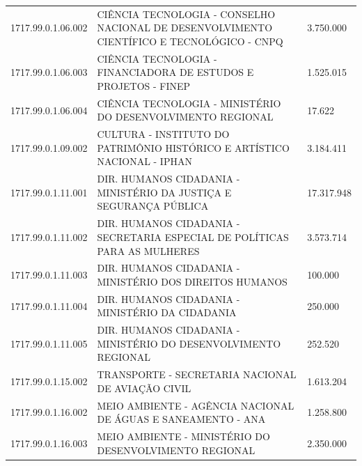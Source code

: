 \documentclass{article}
\begin{document}
\begin{longtable}[c]{m{2cm}|m{13cm}|m{2cm}}
\multicolumn{1}{C{2cm}|}{1717.99.0.1.06.002} & \multicolumn{1}{L{13cm}|}{CIÊNCIA TECNOLOGIA - CONSELHO NACIONAL DE DESENVOLVIMENTO CIENTÍFICO E TECNOLÓGICO - CNPQ} & \multicolumn{1}{R{2cm}}{3.750.000} \\
\multicolumn{1}{C{2cm}|}{1717.99.0.1.06.003} & \multicolumn{1}{L{13cm}|}{CIÊNCIA TECNOLOGIA - FINANCIADORA DE ESTUDOS E PROJETOS - FINEP} & \multicolumn{1}{R{2cm}}{1.525.015} \\
\multicolumn{1}{C{2cm}|}{1717.99.0.1.06.004} & \multicolumn{1}{L{13cm}|}{CIÊNCIA TECNOLOGIA - MINISTÉRIO DO DESENVOLVIMENTO REGIONAL} & \multicolumn{1}{R{2cm}}{17.622} \\
\multicolumn{1}{C{2cm}|}{1717.99.0.1.09.002} & \multicolumn{1}{L{13cm}|}{CULTURA - INSTITUTO DO PATRIMÔNIO HISTÓRICO E ARTÍSTICO NACIONAL - IPHAN} & \multicolumn{1}{R{2cm}}{3.184.411} \\
\multicolumn{1}{C{2cm}|}{1717.99.0.1.11.001} & \multicolumn{1}{L{13cm}|}{DIR. HUMANOS CIDADANIA - MINISTÉRIO DA JUSTIÇA E SEGURANÇA PÚBLICA} & \multicolumn{1}{R{2cm}}{17.317.948} \\
\multicolumn{1}{C{2cm}|}{1717.99.0.1.11.002} & \multicolumn{1}{L{13cm}|}{DIR. HUMANOS CIDADANIA - SECRETARIA ESPECIAL DE POLÍTICAS PARA AS MULHERES} & \multicolumn{1}{R{2cm}}{3.573.714} \\
\multicolumn{1}{C{2cm}|}{1717.99.0.1.11.003} & \multicolumn{1}{L{13cm}|}{DIR. HUMANOS CIDADANIA - MINISTÉRIO DOS DIREITOS HUMANOS} & \multicolumn{1}{R{2cm}}{100.000} \\
\multicolumn{1}{C{2cm}|}{1717.99.0.1.11.004} & \multicolumn{1}{L{13cm}|}{DIR. HUMANOS CIDADANIA - MINISTÉRIO DA CIDADANIA} & \multicolumn{1}{R{2cm}}{250.000} \\
\multicolumn{1}{C{2cm}|}{1717.99.0.1.11.005} & \multicolumn{1}{L{13cm}|}{DIR. HUMANOS CIDADANIA - MINISTÉRIO DO DESENVOLVIMENTO REGIONAL} & \multicolumn{1}{R{2cm}}{252.520} \\
\multicolumn{1}{C{2cm}|}{1717.99.0.1.15.002} & \multicolumn{1}{L{13cm}|}{TRANSPORTE - SECRETARIA NACIONAL DE AVIAÇÃO CIVIL} & \multicolumn{1}{R{2cm}}{1.613.204} \\
\multicolumn{1}{C{2cm}|}{1717.99.0.1.16.002} & \multicolumn{1}{L{13cm}|}{MEIO AMBIENTE - AGÊNCIA NACIONAL DE ÁGUAS E SANEAMENTO - ANA} & \multicolumn{1}{R{2cm}}{1.258.800} \\
\multicolumn{1}{C{2cm}|}{1717.99.0.1.16.003} & \multicolumn{1}{L{13cm}|}{MEIO AMBIENTE - MINISTÉRIO DO DESENVOLVIMENTO REGIONAL} & \multicolumn{1}{R{2cm}}{2.350.000} \\

\end{longtable}
\end{document}
